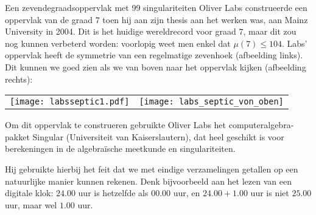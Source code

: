 \begin{surferPage}[Labs]{Een zevendegraadsoppervlak met 99 singulariteiten}
    Oliver Labs construeerde een oppervlak van de graad $7$ toen hij aan zijn thesis aan het werken was, aan Mainz University in 2004. Dit is het huidige wereldrecord voor graad $7$, maar dit zou nog kunnen verbeterd worden: voorlopig weet men enkel dat $\mu(7) \leqslant 104$.
    Labs' oppervlak heeft de symmetrie van een regelmatige zevenhoek (afbeelding links).
    Dit kunnen we goed zien als we van boven naar het oppervlak kijken (afbeelding rechts):

    \vspace*{-0.3em}
    \begin{center}
      \begin{tabular}{c@{\qquad}c}
        \texttt{[image: labsseptic1.pdf]}
        &
        \texttt{[image: labs\_septic\_von\_oben]}
      \end{tabular}
    \end{center}
    \vspace*{-0.3em}

    Om dit oppervlak te construeren gebruikte Oliver Labs het computeralgebra-pakket
    {\sc Singular} (Universiteit van Kaiserslautern), dat heel geschikt is voor berekeningen in de algebra\"ische meetkunde en singulariteiten.

    Hij gebruikte hierbij het feit dat we met eindige verzamelingen getallen op een natuurlijke manier kunnen rekenen. Denk bijvoorbeeld aan het lezen van een digitale klok: $24.00$ uur is hetzelfde als $00.00$ uur, en $24.00 + 1.00$ uur is niet $25.00$ uur, maar wel $1.00$ uur. 
\end{surferPage}
